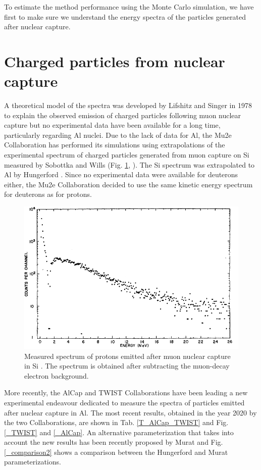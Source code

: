 \documentclass[12pt,a4paper,openright, oneside, titlepage]{book} %
\begin{document}
\noindent
To estimate the method performance using the Monte Carlo simulation,
we have first to make sure we understand the 
energy spectra of the particles generated after nuclear capture.\\


\section{Charged particles from nuclear capture}
A theoretical model of the spectra was developed by Lifshitz and Singer in 1978 \cite{Lifshitz} 
to explain the observed emission of charged particles following muon nuclear capture 
but no experimental data have been available for a long time, particularly regarding Al nuclei.
Due to the lack of data for Al, 
the Mu2e Collaboration has performed its simulations using extrapolations of the experimental spectrum 
of charged particles generated from muon capture on Si 
measured by Sobottka and Wills (Fig. \ref{_sobottka}, \cite{Sobottka}).
The Si spectrum was extrapolated to Al by Hungerford \cite{Hungerford}.
Since no experimental data were available for deuterons either, 
the Mu2e Collaboration decided to use the same kinetic energy spectrum for deuterons as for protons.

\begin{figure}
\centering
\includegraphics[scale=0.8]{sobottka}
\caption[Proton spectrum from nuclear capture in Si]{Measured spectrum of protons emitted after muon nuclear capture in Si \cite{Sobottka}. 
The spectrum is obtained after subtracting the muon-decay electron background.}
\label{_sobottka}
\end{figure}

\noindent 
More recently, the AlCap \cite{AlCap:2018} and TWIST \cite{TWIST:2020} Collaborations 
have been leading a new experimental endeavour dedicated to measure the spectra 
of particles emitted after nuclear capture in Al. 
The most recent results, obtained in the year 2020 by the two Collaborations, 
are shown in Tab. \ref{T_AlCap_TWIST} and Fig. \ref{_TWIST} and  \ref{_AlCap}. 
An alternative parameterization that takes into account the new results has been recently 
proposed by Murat \cite{Pasha:spectra} and Fig. \ref{_comparison2} \cite{io:comparison} 
shows a comparison between the Hungerford and Murat parameterizations.
\end{document}
